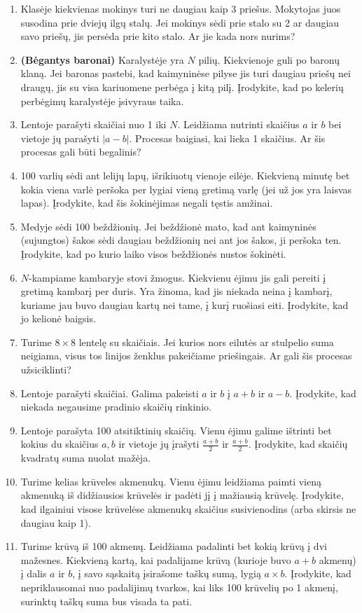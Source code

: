\documentclass[11pt,a4paper]{scrartcl}
\begin{document}
\begin{enumerate}
    \item Klasėje kiekvienas mokinys turi ne daugiau kaip 3 priešus. Mokytojas juos susodina prie dviejų ilgų stalų. Jei mokinys sėdi prie stalo su 2 ar daugiau savo priešų, jis persėda prie kito stalo. Ar jie kada nors nurims?
    \item \textbf{(Bėgantys baronai)} Karalystėje yra $N$ pilių. Kiekvienoje guli po baronų klaną. Jei baronas pastebi, kad kaimyninėse pilyse jis turi daugiau priešų nei draugų, jis su visa kariuomene perbėga į kitą pilį. Įrodykite, kad po kelerių perbėgimų karalystėje įsivyraus taika.
    \item Lentoje parašyti skaičiai nuo 1 iki $N$. Leidžiama nutrinti skaičius $a$ ir $b$ bei vietoje jų parašyti $|a-b|$. Procesas baigiasi, kai lieka 1 skaičius. Ar šis procesas gali būti begalinis?
    \item 100 varlių sėdi ant lelijų lapų, išrikiuotų vienoje eilėje. Kiekvieną minutę bet kokia viena varlė peršoka per lygiai vieną gretimą varlę (jei už jos yra laisvas lapas). Įrodykite, kad šis šokinėjimas negali tęstis amžinai.
    \item Medyje sėdi 100 beždžionių. Jei beždžionė mato, kad ant kaimyninės (sujungtos) šakos sėdi daugiau beždžionių nei ant jos šakos, ji peršoka ten. Įrodykite, kad po kurio laiko visos beždžionės nustos šokinėti.
    \item $N$-kampiame kambaryje stovi žmogus. Kiekvienu ėjimu jis gali pereiti į gretimą kambarį per duris. Yra žinoma, kad jis niekada neina į kambarį, kuriame jau buvo daugiau kartų nei tame, į kurį ruošiasi eiti. Įrodykite, kad jo kelionė baigsis.
    
    \item Turime $8 \times 8$ lentelę su skaičiais. Jei kurios nors eilutės ar stulpelio suma neigiama, visus tos linijos ženklus pakeičiame priešingais. Ar gali šis procesas užsiciklinti?
    \item Lentoje parašyti skaičiai. Galima pakeisti $a$ ir $b$ į $a+b$ ir $a-b$. Įrodykite, kad niekada negausime pradinio skaičių rinkinio.
    \item Lentoje parašyta 100 atsitiktinių skaičių. Vienu ėjimu galime ištrinti bet kokius du skaičius $a, b$ ir vietoje jų įrašyti $\frac{a+b}{2}$ ir $\frac{a+b}{2}$. Įrodykite, kad skaičių kvadratų suma nuolat mažėja.
    \item Turime kelias krūveles akmenukų. Vienu ėjimu leidžiama paimti vieną akmenuką iš didžiausios krūvelės ir padėti jį į mažiausią krūvelę. Įrodykite, kad ilgainiui visose krūvelėse akmenukų skaičius susivienodins (arba skirsis ne daugiau kaip 1).
    \item Turime krūvą iš 100 akmenų. Leidžiama padalinti bet kokią krūvą į dvi mažesnes. Kiekvieną kartą, kai padalijame krūvą (kurioje buvo $a+b$ akmenų) į dalis $a$ ir $b$, į savo sąskaitą įsirašome taškų sumą, lygią $a \times b$. Įrodykite, kad nepriklausomai nuo padalijimų tvarkos, kai liks 100 krūvelių po 1 akmenį, surinktų taškų suma bus visada ta pati.
    

\end{enumerate}
\end{document}
